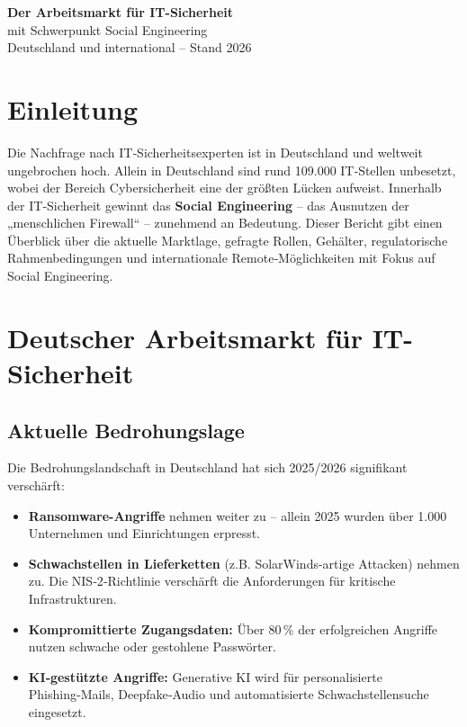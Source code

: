 \documentclass[10pt,a4paper]{article}
\begin{document}
	
	\begin{center}
		{\huge \textbf{Der Arbeitsmarkt für IT-Sicherheit}} \\[0.3em]
		{\Large mit Schwerpunkt Social Engineering} \\[0.3em]
		{\large Deutschland und international – Stand 2026}
	\end{center}
	
	\section{Einleitung}
	Die Nachfrage nach IT‑Sicherheitsexperten ist in Deutschland und weltweit ungebrochen hoch. Allein in Deutschland sind rund 109.000 IT‑Stellen unbesetzt, wobei der Bereich Cybersicherheit eine der größten Lücken aufweist. Innerhalb der IT‑Sicherheit gewinnt das \textbf{Social Engineering} – das Ausnutzen der „menschlichen Firewall“ – zunehmend an Bedeutung. Dieser Bericht gibt einen Überblick über die aktuelle Marktlage, gefragte Rollen, Gehälter, regulatorische Rahmenbedingungen und internationale Remote‑Möglichkeiten mit Fokus auf Social Engineering.
	
	\section{Deutscher Arbeitsmarkt für IT-Sicherheit}
	
	\subsection{Aktuelle Bedrohungslage}
	Die Bedrohungslandschaft in Deutschland hat sich 2025/2026 signifikant verschärft:
	\begin{itemize}
		\item \textbf{Ransomware-Angriffe} nehmen weiter zu – allein 2025 wurden über 1.000 Unternehmen und Einrichtungen erpresst.
		\item \textbf{Schwachstellen in Lieferketten} (z.B. SolarWinds-artige Attacken) nehmen zu. Die NIS‑2‑Richtlinie verschärft die Anforderungen für kritische Infrastrukturen.
		\item \textbf{Kompromittierte Zugangsdaten:} Über 80\,\% der erfolgreichen Angriffe nutzen schwache oder gestohlene Passwörter.
		\item \textbf{KI‑gestützte Angriffe:} Generative KI wird für personalisierte Phishing‑Mails, Deepfake‑Audio und automatisierte Schwachstellensuche eingesetzt.
	\end{itemize}
	
\end{document}
